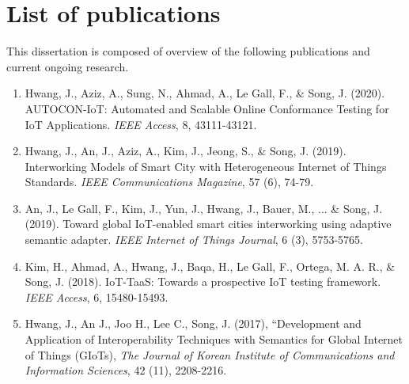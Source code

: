 
\section*{List of publications}

This dissertation is composed of overview of the following publications and current ongoing research.

\begin{enumerate}

\item Hwang, J., Aziz, A., Sung, N., Ahmad, A., Le Gall, F., \& Song, J. (2020). AUTOCON-IoT: Automated and Scalable Online Conformance Testing for IoT Applications. \textit{IEEE Access}, 8, 43111-43121.

\item Hwang, J., An, J., Aziz, A., Kim, J., Jeong, S., \& Song, J. (2019). Interworking Models of Smart City with Heterogeneous Internet of Things Standards. \textit{IEEE Communications Magazine}, 57 (6), 74-79.

\item An, J., Le Gall, F., Kim, J., Yun, J., Hwang, J., Bauer, M., ... \& Song, J. (2019). Toward global IoT-enabled smart cities interworking using adaptive semantic adapter. \textit{IEEE Internet of Things Journal}, 6 (3), 5753-5765.

\item Kim, H., Ahmad, A., Hwang, J., Baqa, H., Le Gall, F., Ortega, M. A. R., \& Song, J. (2018). IoT-TaaS: Towards a prospective IoT testing framework. \textit{IEEE Access}, 6, 15480-15493.

\item Hwang, J., An J., Joo H., Lee C., Song, J. (2017), “Development and Application of Interoperability Techniques with Semantics for Global Internet of Things (GIoTs), \textit{The Journal of Korean Institute of Communications and Information Sciences}, 42 (11), 2208-2216.

\end{enumerate}

\clearpage